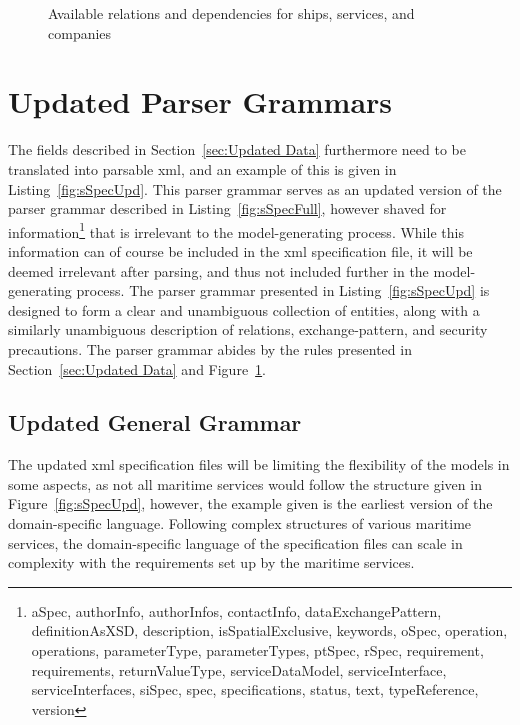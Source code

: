 \begin{figure}[h]
  \caption{Available relations and dependencies for ships, services, and companies}
  \label{fig:entities}
\end{figure}


\section{Updated Parser Grammars}

The fields described in Section~\ref{sec:Updated Data} furthermore need to be translated into parsable xml, and an example of this is given in Listing~\ref{fig:sSpecUpd}. This parser grammar serves as an updated version of the parser grammar described in Listing~\ref{fig:sSpecFull}, however shaved for information\footnote{aSpec, authorInfo, authorInfos, contactInfo, dataExchangePattern, definitionAsXSD, description, isSpatialExclusive, keywords, oSpec, operation, operations, parameterType, parameterTypes, ptSpec, rSpec, requirement, requirements, returnValueType, serviceDataModel, serviceInterface, serviceInterfaces, siSpec, spec, specifications, status, text, typeReference, version} that is irrelevant to the model-generating process. While this information can of course be included in the xml specification file, it will be deemed irrelevant after parsing, and thus not included further in the model-generating process. The parser grammar presented in Listing~\ref{fig:sSpecUpd} is designed to form a clear and unambiguous collection of entities, along with a similarly unambiguous description of relations, exchange-pattern, and security precautions. The parser grammar abides by the rules presented in Section~\ref{sec:Updated Data} and Figure~\ref{fig:entities}.

\subsection{Updated General Grammar}
The updated xml specification files will be limiting the flexibility of the models in some aspects, as not all maritime services would follow the structure given in Figure~\ref{fig:sSpecUpd}, however, the example given is the earliest version of the domain-specific language. Following complex structures of various maritime services, the domain-specific language of the specification files can scale in complexity with the requirements set up by the maritime services.

